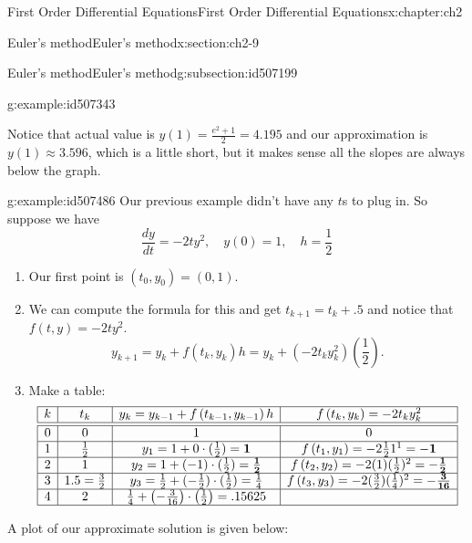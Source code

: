 \documentclass[oneside,10pt,]{book}
\numberwithin{equation}{section}
\numberwithin{equation}{section}
\newcommand{\amp}{&}
\begin{document}
\begin{chapterptx}{First Order Differential Equations}{}{First Order Differential Equations}{}{}{x:chapter:ch2}
\begin{sectionptx}{Euler's method}{}{Euler's method}{}{}{x:section:ch2-9}
\begin{subsectionptx}{Euler's method}{}{Euler's method}{}{}{g:subsection:id507199}
\begin{example}{}{g:example:id507343}
\begin{enumerate}
%
\end{enumerate}
Notice that actual value is \(y(1)=\frac{e^{2}+1}{2}=4.195\) and our approximation is \(y(1)\approx3.596\), which is a little short, but it makes sense all the slopes are always below the graph.%
\end{example}
\begin{example}{}{g:example:id507486}%
Our previous example didn't have any \(t\)s to plug in. So suppose we have%
\begin{equation*}
\frac{dy}{dt}=-2ty^{2},\quad y(0)=1,\quad h=\frac{1}{2}
\end{equation*}
%
%
\begin{enumerate}
\item{}Our first point is \((t_{0},y_{0})=\left(0,1\right)\).%
\item{}We can compute the formula for this and get \(t_{k+1}=t_{k}+.5\) and notice that \(f\left(t,y\right)=-2ty^{2}\).%
\begin{equation*}
y_{k+1}=y_{k}+f\left(t_{k},y_{k}\right)h=y_{k}+\left(-2t_{k}y_{k}^{2}\right)(\frac{1}{2}).
\end{equation*}
%
\item{}Make a table:%
\begin{equation*}
\begin{array}{|c|c|c|c|}
\hline
k \amp t_{k} \amp y_{k}=y_{k-1}+f\left(t_{k-1},y_{k-1}\right)h \amp f\left(t_{k},y_{k}\right)=-2t_{k}y_{k}^{2}\\
\hline
\hline
0 \amp 0 \amp 1 \amp 0\\
\hline
1 \amp \frac{1}{2} \amp y_{1}=1+0\cdot(\frac{1}{2})=\mathbf{1} \amp f\left(t_{1},y_{1}\right)=-2\frac{1}{2}1^{1}=\mathbf{-1}\\
\hline
2 \amp 1 \amp y_{2}=1+(-1)\cdot(\frac{1}{2})=\mathbf{\frac{1}{2}} \amp f\left(t_{2},y_{2}\right)=-2(1)(\frac{1}{2})^{2}=\mathbf{-\frac{1}{2}}\\
\hline
3 \amp 1.5=\frac{3}{2} \amp y_{3}=\frac{1}{2}+(-\frac{1}{2})\cdot(\frac{1}{2})=\frac{1}{4} \amp f\left(t_{3},y_{3}\right)=-2(\frac{3}{2})(\frac{1}{4})^{2}=\mathbf{-\frac{3}{16}}\\
\hline
4 \amp 2 \amp \frac{1}{4}+\left(-\frac{3}{16}\right)\cdot\left(\frac{1}{2}\right)=.15625 \amp \\
\hline
\end{array}
\end{equation*}
%
\end{enumerate}
A plot of our approximate solution is given below:%
\begin{image}{0}{1}{0}%

\end{image}
\end{example}
\end{subsectionptx}
\end{sectionptx}
\end{chapterptx}
\end{document}
